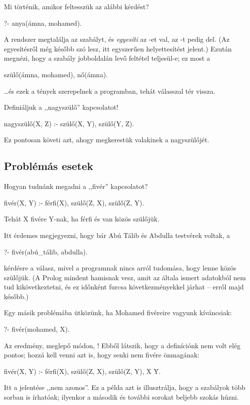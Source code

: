 Mi történik, amikor feltesszük az alábbi kérdést?
\begin{query}
?- anya(ámna, mohamed).
\end{query}
A rendszer megtalálja az  szabályt, és
\emph{egyesíti} az -et \-val, az
-t pedig del. (Az
egyesítésről még később szó lesz, itt egyszerűen
helyettesítést jelent.) Ezután megnézi, hogy a
szabály jobboldalán levő feltétel teljesül-e; ez
most a
\begin{query}
szülő(ámna, mohamed), nő(ámna).
\end{query}
\dots és ezek a tények szerepelnek a programban,
tehát  válasszal tér vissza.

Definiáljuk a ,,nagyszülő'' kapcsolatot!
\begin{program}
nagyszülő(X, Z) :- szülő(X, Y), szülő(Y, Z).
\end{program}
Ez pontosan követi azt, ahogy megkerestük valakinek
a nagyszülőjét.

\subsection*{Problémás esetek}

Hogyan tudnánk megadni a ,,fivér'' kapcsolatot?
\begin{program}
fivér(X, Y) :- férfi(X), szülő(Z, X), szülő(Z, Y).
\end{program}
Tehát X fivére Y-nak, ha férfi és van közös
szülőjük.

Itt érdemes megjegyezni, hogy bár Abú Tálib és
Abdulla testvérek voltak, a
\begin{query}
?- fivér(abú_tálib, abdulla).
\end{query}
kérdésre  a válasz, mivel a programnak
nincs arról tudomása, hogy lenne közös szülőjük. (A
Prolog mindent hamisnak vesz, amit az általa ismert
adatokból nem tud kikövetkeztetni, és ez időnként
furcsa következményekkel járhat -- erről majd
később.)

Egy másik problémába ütközünk, ha Mohamed fivéreire
vagyunk kíváncsiak:
\begin{query}
?- fivér(mohamed, X).
\end{query}
Az eredmény, meglepő módon, ! Ebből
látszik, hogy a definíciónk nem volt elég pontos;
hozzá kell venni azt is, hogy senki nem fivére
önmagának:
\begin{program}
fivér(X, Y) :-
    férfi(X),
    szülő(Z, X), szülő(Z, Y),
    X \= Y.
\end{program}
Itt a \pr{\textbackslash=} jelentése ,,nem azonos''.
\index{\pr{\textbackslash=}} Ez a példa azt is
illusztrálja, hogy a szabályok több sorban is
írhatóak; ilyenkor a második és további sorokat
beljebb szokás húzni.


